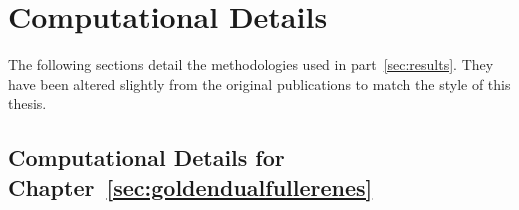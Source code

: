 \chapter{Computational Details}
\label{sec:ComputationalDetails}

The following sections detail the methodologies used in part~\ref{sec:results}.
They have been altered slightly from the original
publications\autocite{Trombach_HollowGoldCages_2016,Trombach_stickyhardsphereLennardJonestypeclusters_2018,Trombach_GregoryNewtonproblemkissing_2018}
to match the style of this thesis.

\section{Computational Details for Chapter~\ref{sec:goldendualfullerenes}}
\label{sec:ComputationalDetailsforGoldenDualFullerenes}

